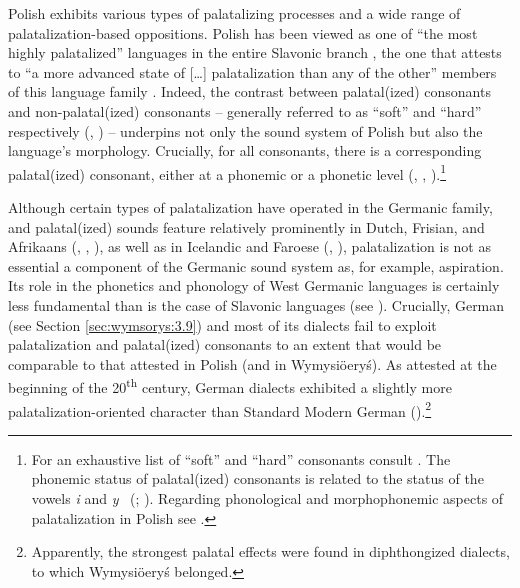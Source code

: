 \documentclass[output=paper,hidelinks]{langscibook}
\begin{document}
Polish exhibits various types of palatalizing processes and a wide range of palatal\-i\-zation-based oppositions. Polish has been viewed as one of ``the most highly palatalized'' languages in the entire Slavonic branch \citep[165]{sussex_slavic_2006}, the one that attests to ``a more advanced state of [\ldots] palatalization than any of the other'' members of this language family \citep[165]{sussex_slavic_2006}. Indeed, the contrast between palatal(ized) consonants and non-palatal(ized) consonants – generally referred to as ``soft'' and ``hard'' respectively (\citealt[244]{urbanczyk_encyklopedia_1991}, \citealt[43--44]{strutynski_gramatyka_1998}) – underpins not only the sound system of Polish but also the language's morphology. Crucially, for all consonants, there is a corresponding palatal(ized) consonant, either at a phonemic or a phonetic level (\citealt[687--690]{rothstein_polish_1993}, %
\citealt[165--166]{sussex_slavic_2006}, \citealt[4--7]{gussmann_phonology_2007}).\footnote{For an exhaustive list of ``soft'' and ``hard'' consonants consult \citet{strutynski_gramatyka_1998}. The phonemic status of palatal(ized) consonants is related to the status of the vowels \textit{i} and \textit{y} ~(\citealt[77--78]{strutynski_gramatyka_1998}; \citealt[167]{sussex_slavic_2006}). Regarding phonological and morphophonemic aspects of palatalization in Polish see \citet{gussmann_phonology_2007}.}

Although certain types of palatalization have operated in the Germanic family, and palatal(ized) sounds feature relatively prominently in Dutch, Frisian, and Afrikaans (\citealt[529]{hoekstra_frisian_1994}, \citealt[482]{donaldson_afrikaans_1994}, \citealt{van_der_hoek_palatalization_2010}), as well as in Icelandic and Faroese (\citealt[193--195]{barnes_faroese_nodate}, \citealt[48--49]{harbert_germanic_2007}), palatalization is not as essential a component of the Germanic sound system as, for example, aspiration. Its role in the phonetics and phonology of West Germanic languages is certainly less fundamental than is the case of Slavonic languages (see \citealt[48--49]{harbert_germanic_2007}). Crucially, German (see Section \ref{sec:wymsorys:3.9}) and most of its dialects fail to exploit palatalization and palatal(ized) consonants to an extent that would be comparable to that attested in Polish (and in Wymysiöeryś). As attested at the beginning of the 20\textsuperscript{th} century, German dialects exhibited a slightly more palatalization-oriented character than Standard Modern German (\citealt[38--40, 53--54, 60, 71]{von_unwerth_schlesische_1908}).\footnote{Apparently, the strongest palatal effects were found in diphthongized dialects, to which Wymysiöeryś belonged.}
\end{document}

